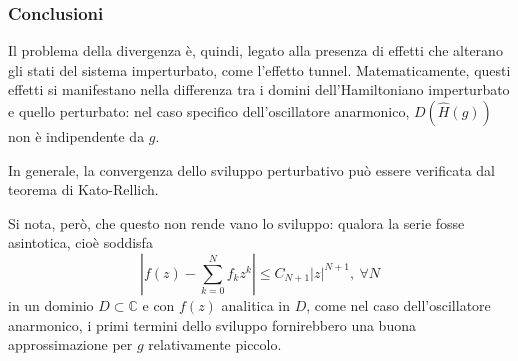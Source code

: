 \documentclass[10pt]{beamer}
\begin{document}
   \begin{frame}
	   \frametitle{Conclusioni}
	   Il problema della divergenza \`e, quindi, legato alla presenza di effetti che alterano gli stati del sistema imperturbato, come l'effetto tunnel.
	   Matematicamente, questi effetti si manifestano nella differenza tra i domini dell'Hamiltoniano imperturbato e quello perturbato: nel caso specifico dell'oscillatore anarmonico, $D(\hat{H}(g))$ non \`e indipendente da $g$. 
	   
	   In generale, la convergenza dello sviluppo perturbativo pu\`o essere verificata dal teorema di Kato-Rellich.

	   \vspace{.25cm}
	   Si nota, per\`o, che questo non rende vano lo sviluppo: qualora la serie fosse asintotica, cio\`e soddisfa
\[
\left\lvert f(z) - \sum_{k=0}^{N} f_k z^k \right\rvert \le  C_{N+1} \lvert z \rvert ^{N+1} , \ \forall N
\] 
	   in un dominio $D \subset \mathbb{C}$ e con $f(z)$ analitica in $D$, come nel caso dell'oscillatore anarmonico, i primi termini dello sviluppo fornirebbero una buona approssimazione per $g$ relativamente piccolo.
   \end{frame}
\end{document}
